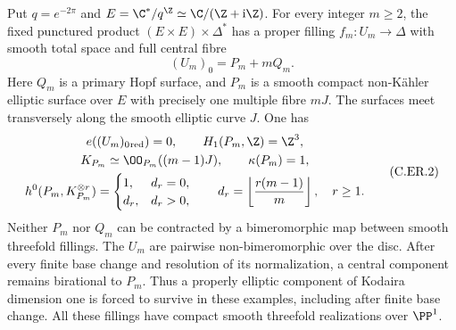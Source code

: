 
\begin{proposition}\label{cdp:st:C.2.UN.6}
Put $q=e^{-2\pi}$ and $E=\C^*/q^{\Z}\simeq\C/(\Z+\mathrm i\Z)$.
For every integer $m\ge2$, the fixed punctured product
$(E\times E)\times\Delta^*$ has a proper filling
$f_m:U_m\to\Delta$ with smooth total space and full central fibre
\[
                    (U_m)_0=P_m+mQ_m.             \tag{C.ER.1}\label{cdp:eq:C.ER.1}
\]
Here $Q_m$ is a primary Hopf surface, and $P_m$ is a smooth compact
non-K\"ahler elliptic surface over $E$ with precisely one multiple
fibre $mJ$. The surfaces meet transversely along the smooth elliptic
curve $J$. One has
\[
 \begin{gathered}
 e((U_m)_0{}_{\rm red})=0,\qquad H_1(P_m,\Z)=\Z^3,\\
 K_{P_m}\simeq\OO_{P_m}((m-1)J),\qquad \kappa(P_m)=1,\\
 h^0(P_m,K_{P_m}^{\otimes r})=
 \begin{cases}
 1,&d_r=0,\\
 d_r,&d_r>0,
 \end{cases}
 \qquad d_r=\left\lfloor\frac{r(m-1)}m\right\rfloor,
 \quad r\ge1.
 \end{gathered}                                   \tag{C.ER.2}\label{cdp:eq:C.ER.2}
\]
Neither $P_m$ nor $Q_m$ can be contracted by a bimeromorphic map
between smooth threefold fillings. The $U_m$ are pairwise
non-bimeromorphic over the disc. After every finite base change and
resolution of its normalization, a central component remains
birational to $P_m$. Thus a properly elliptic component of Kodaira
dimension one is forced to survive in these examples, including
after finite base change. All these fillings have compact smooth
threefold realizations over $\PP^1$.
\end{proposition}
